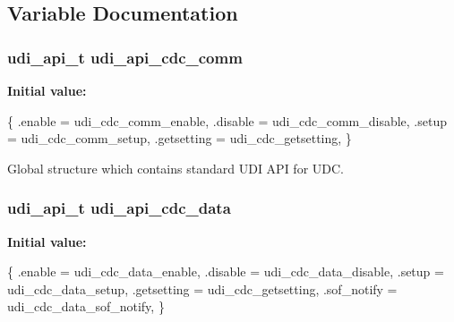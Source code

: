 \subsection{Variable Documentation}
\hypertarget{group__udi__cdc__group__udc_gad7b0a90350a1f1a7c62fab1a749bf687}{
\subsubsection[{udi\-\_\-api\-\_\-cdc\-\_\-comm}]{ {\bf udi\-\_\-api\-\_\-t} udi\-\_\-api\-\_\-cdc\-\_\-comm}}\label{group__udi__cdc__group__udc_gad7b0a90350a1f1a7c62fab1a749bf687}
{\bfseries Initial value\-:}
\begin{DoxyCode}
 \{
        .enable = udi\_cdc\_comm\_enable,
        .disable = udi\_cdc\_comm\_disable,
        .setup = udi\_cdc\_comm\_setup,
        .getsetting = udi\_cdc\_getsetting,
\}
\end{DoxyCode}


Global structure which contains standard U\-D\-I A\-P\-I for U\-D\-C. 

\hypertarget{group__udi__cdc__group__udc_ga3f85c229cc3218b75cb4844b8e9ad2d7}{
\subsubsection[{udi\-\_\-api\-\_\-cdc\-\_\-data}]{ {\bf udi\-\_\-api\-\_\-t} udi\-\_\-api\-\_\-cdc\-\_\-data}}\label{group__udi__cdc__group__udc_ga3f85c229cc3218b75cb4844b8e9ad2d7}
{\bfseries Initial value\-:}
\begin{DoxyCode}
 \{
        .enable = udi\_cdc\_data\_enable,
        .disable = udi\_cdc\_data\_disable,
        .setup = udi\_cdc\_data\_setup,
        .getsetting = udi\_cdc\_getsetting,
        .sof\_notify = udi\_cdc\_data\_sof\_notify,
\}
\end{DoxyCode}
